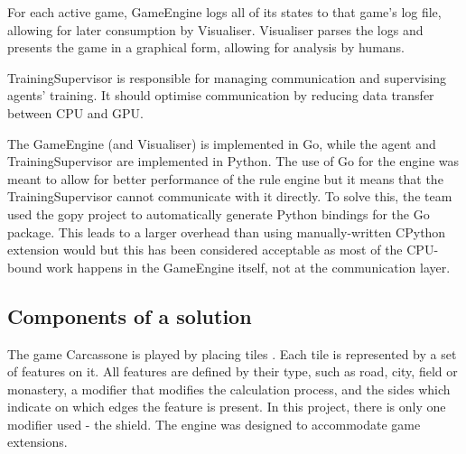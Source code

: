 For each active game, GameEngine logs all of its states to that game's log file,
allowing for later consumption by Visualiser. Visualiser parses the logs
and presents the game in a graphical form, allowing for analysis by humans.

TrainingSupervisor is responsible for managing communication and supervising agents' training.
It should optimise communication by reducing data transfer between CPU and GPU.

The GameEngine (and Visualiser) is implemented in Go, while the agent and TrainingSupervisor
are implemented in Python. The use of Go for the engine was meant to allow for better performance of
the rule engine but it means that the TrainingSupervisor cannot communicate with it directly.
To solve this, the team used the gopy project \cite{gopy} to automatically generate
Python bindings \cite{LanguageBindings} for the Go package. This leads to a larger overhead than
using manually-written CPython extension would but this has been considered acceptable as most of
the CPU-bound work happens in the GameEngine itself, not at the communication layer.

\subsection{Components of a solution}

The game Carcassone is played by placing tiles \cite{CarcassoneRules}. Each tile is represented by a set of features on it. All features are defined by their type, such as road, city, field or monastery, a modifier that modifies the calculation process, and the sides which indicate on which edges the feature is present. In this project, there is only one modifier used - the shield. The engine was designed to accommodate game extensions.

